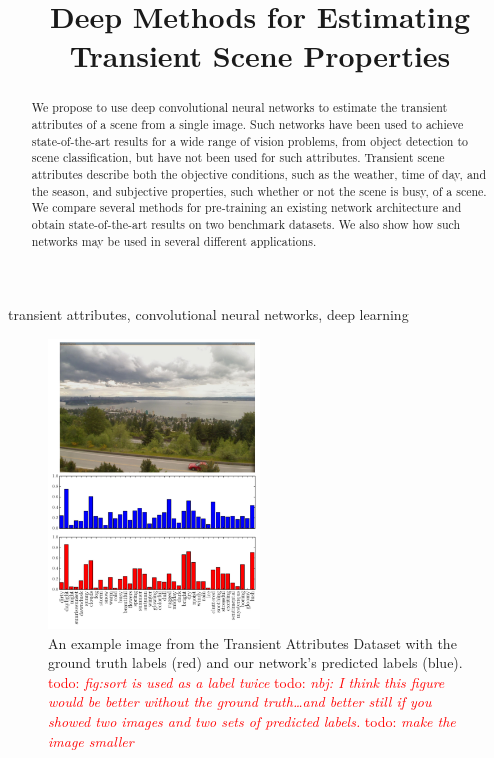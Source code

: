 \documentclass{article}
\title{Deep Methods for Estimating Transient Scene Properties}
\newcommand{\todo}[1]{\textcolor{red}{todo: {\em #1}}}
\begin{document}
\maketitle

\begin{abstract}

We propose to use deep convolutional neural networks to estimate the
transient attributes of a scene from a single image. Such networks
have been used to achieve state-of-the-art results for a wide range of
vision problems, from object detection to scene classification, but
have not been used for such attributes. Transient scene attributes
describe both the objective conditions, such as the weather, time of
day, and the season, and subjective properties, such whether or not
the scene is busy, of a scene. We compare several methods for
pre-training an existing network architecture and obtain
state-of-the-art results on two benchmark datasets.  We also show how
such networks may be used in several different applications.

\end{abstract}

\begin{keywords}
transient attributes, convolutional neural networks, deep learning
\end{keywords}

\begin{figure}
	\centering
		\includegraphics[width=0.5\textwidth]{figs/bars.pdf}

		\caption{An example image from the Transient Attributes Dataset with the ground truth labels
						 (red) and our network's predicted labels (blue).
             \todo{fig:sort is used as a label twice}
           \todo{nbj: I think this figure would be better
           without the ground truth\dots and better still if you
         showed two images and two sets of predicted labels.}
         \todo{make the image smaller}}
             
\end{figure}
\end{document}
